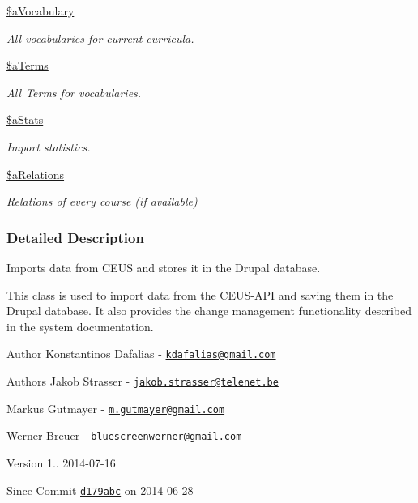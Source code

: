 \begin{DoxyCompactItemize}
\hyperlink{classceus__importer_a84266bdaf38a24150ceb43d88ebb230d}{\$a\+Vocabulary}
\begin{DoxyCompactList}\small\item\em All vocabularies for current curricula. \end{DoxyCompactList}\item 
\hyperlink{classceus__importer_a504ee22f4791f6d41ebe97c5786ee547}{\$a\+Terms}
\begin{DoxyCompactList}\small\item\em All Terms for vocabularies. \end{DoxyCompactList}\item 
\hyperlink{classceus__importer_ac383d13daab8093b15c3925f305d8c08}{\$a\+Stats}
\begin{DoxyCompactList}\small\item\em Import statistics. \end{DoxyCompactList}\item 
\hyperlink{classceus__importer_a112b3b5ddcf754007f9466ec5ab94683}{\$a\+Relations}
\begin{DoxyCompactList}\small\item\em Relations of every course (if available) \end{DoxyCompactList}\end{DoxyCompactItemize}


\subsubsection{Detailed Description}
Imports data from C\+E\+U\+S and stores it in the Drupal database. 

This class is used to import data from the C\+E\+U\+S-\/\+A\+P\+I and saving them in the Drupal database. It also provides the change management functionality described in the system documentation.

\begin{DoxyAuthor}{Author}
Konstantinos Dafalias -\/ \href{mailto:kdafalias@gmail.com}{\tt kdafalias@gmail.\+com} 
\end{DoxyAuthor}
\begin{DoxyAuthor}{Authors}
Jakob Strasser -\/ \href{mailto:jakob.strasser@telenet.be}{\tt jakob.\+strasser@telenet.\+be} 

Markus Gutmayer -\/ \href{mailto:m.gutmayer@gmail.com}{\tt m.\+gutmayer@gmail.\+com} 

Werner Breuer -\/ \href{mailto:bluescreenwerner@gmail.com}{\tt bluescreenwerner@gmail.\+com} 
\end{DoxyAuthor}
\begin{DoxyVersion}{Version}
1.. 2014-\/07-\/16 
\end{DoxyVersion}
\begin{DoxySince}{Since}
Commit \href{http://github.com/TheJake123/DrupalModul/commit/d179abcc5e05743086cd67cf1ce30b08923a7183}{\tt d179abc} on 2014-\/06-\/28 
\end{DoxySince}


